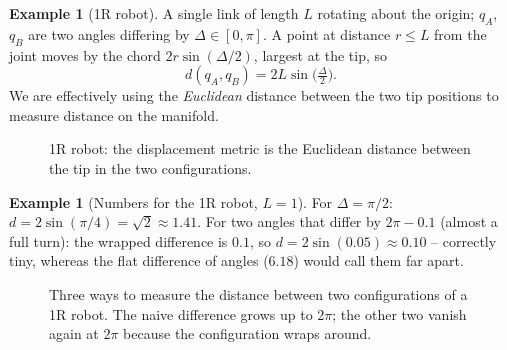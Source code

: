 \documentclass[11pt,a4paper]{article}
\newcommand{\Sph}{\mathbb{S}}
\theoremstyle{definition}
\newtheorem{example}[definition]{Example}
\theoremstyle{plain}
\begin{document}
\begin{example}[1R robot]
A single link of length $L$ rotating about the origin; $q_A$, $q_B$ are two angles differing by $\Delta\in[0,\pi]$. A point at distance $r\le L$ from the joint moves by the chord $2r\sin(\Delta/2)$, largest at the tip, so
\[
  d(q_A,q_B)=2L\sin\!\big(\tfrac{\Delta}{2}\big).
\]
We are effectively using the \emph{Euclidean} distance between the two tip positions to measure distance on the manifold.
\end{example}

\begin{figure}[ht]
\centering
{}
\caption{1R robot: the displacement metric is the Euclidean distance between the tip in the two configurations.}
\end{figure}

\begin{example}[Numbers for the 1R robot, $L=1$]
For $\Delta=\pi/2$: $d=2\sin(\pi/4)=\sqrt2\approx1.41$. For two angles that differ by $2\pi-0.1$ (almost a full turn): the wrapped difference is $0.1$, so $d=2\sin(0.05)\approx0.10$ -- correctly tiny, whereas the flat difference of angles ($6.18$) would call them far apart.
\end{example}

\begin{figure}[ht]
\centering
{}
\caption{Three ways to measure the distance between two configurations of a 1R robot. The naive difference grows up to $2\pi$; the other two vanish again at $2\pi$ because the configuration wraps around.}
\end{figure}
\end{document}
